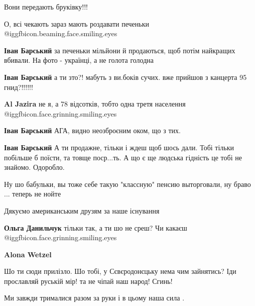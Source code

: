  
 
 
 
 

Вони передають бруківку!!!

О, всі чекають зараз мають роздавати печеньки @igg{fbicon.beaming.face.smiling.eyes} 

\begin{itemize} %
\textbf{Іван Барський} за печеньки мільйони й продаються, щоб потім найкращих вбивали. На фото - українці, а не голота голодна

\textbf{Іван Барський} а ти зто?! мабуть з ви.боків сучих. вже прийшов з канцерта 95 гнид?!!!!!!

\textbf{Al Jazira} не я, а 78 відсотків, тобто одна третя населення @igg{fbicon.face.grinning.smiling.eyes} 

\textbf{Іван Барський} АГА, видно неозброєним оком, що з тих.

\textbf{Іван Барський} А ти продажне, тільки і ждеш щоб шось дали.
Тобі тільки побільше б поїсти, та товще поср...ть. А що є ще людська гідність це тобі не знайомо.
Одоробло.

Ну шо бабульки, вы тоже себе такую "классную" пенсию выторговали, ну браво ... теперь не нойте

Дякуємо американським друзям за наше існування

\textbf{Ольга Данильчук} тільки так, а ти шо не среш? Чи какаєш @igg{fbicon.face.grinning.smiling.eyes} 

\textbf{Alona Wetzel} 

Шо ти сюди прилізло. Шо тобі, у Сєвєродонєцьку нема чим зайнятись? Іди прославляй
руській мір! та не чіпай наш народ! Сгинь!

\end{itemize} %

Ми завжди трималися разом за руки і в цьому наша сила .


